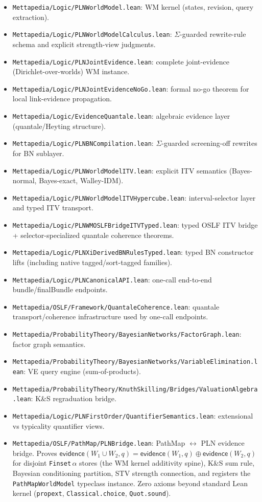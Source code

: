 \documentclass[11pt]{article}
\newcommand{\ev}{\mathsf{evidence}}
\begin{document}
\begin{itemize}[leftmargin=2em]
\item \texttt{Mettapedia/Logic/PLNWorldModel.lean}: WM kernel (states, revision, query extraction).
\item \texttt{Mettapedia/Logic/PLNWorldModelCalculus.lean}: $\Sigma$-guarded rewrite-rule schema
and explicit strength-view judgments.
\item \texttt{Mettapedia/Logic/PLNJointEvidence.lean}: complete joint-evidence (Dirichlet-over-worlds) WM instance.
\item \texttt{Mettapedia/Logic/PLNJointEvidenceNoGo.lean}: formal no-go theorem for local link-evidence propagation.
\item \texttt{Mettapedia/Logic/EvidenceQuantale.lean}: algebraic evidence layer (quantale/Heyting structure).
\item \texttt{Mettapedia/Logic/PLNBNCompilation.lean}: $\Sigma$-guarded screening-off rewrites for BN sublayer.
\item \texttt{Mettapedia/Logic/PLNWorldModelITV.lean}: explicit ITV semantics (Bayes-normal, Bayes-exact, Walley-IDM).
\item \texttt{Mettapedia/Logic/PLNWorldModelITVHypercube.lean}: interval-selector layer and typed ITV transport.
\item \texttt{Mettapedia/Logic/PLNWMOSLFBridgeITVTyped.lean}: typed OSLF ITV bridge + selector-specialized quantale coherence theorems.
\item \texttt{Mettapedia/Logic/PLNXiDerivedBNRulesTyped.lean}: typed BN constructor lifts (including native tagged/sort-tagged families).
\item \texttt{Mettapedia/Logic/PLNCanonicalAPI.lean}: one-call end-to-end bundle/finalBundle endpoints.
\item \texttt{Mettapedia/OSLF/Framework/QuantaleCoherence.lean}: quantale transport/coherence infrastructure used by one-call endpoints.
\item \texttt{Mettapedia/ProbabilityTheory/BayesianNetworks/FactorGraph.lean}: factor graph semantics.
\item \texttt{Mettapedia/ProbabilityTheory/BayesianNetworks/VariableElimination.lean}: VE query engine (sum-of-products).
\item \texttt{Mettapedia/ProbabilityTheory/KnuthSkilling/Bridges/ValuationAlgebra.lean}: K\&S regraduation bridge.
\item \texttt{Mettapedia/Logic/PLNFirstOrder/QuantifierSemantics.lean}: extensional vs typicality quantifier views.
\item \texttt{Mettapedia/OSLF/PathMap/PLNBridge.lean}: PathMap $\leftrightarrow$ PLN evidence bridge.
  Proves $\ev(W_1\cup W_2,q)=\ev(W_1,q)\oplus\ev(W_2,q)$ for disjoint \texttt{Finset}\,$\alpha$ stores
  (the WM kernel additivity spine), K\&S sum rule, Bayesian conditioning partition,
  STV strength connection, and registers the \texttt{PathMapWorldModel} typeclass instance.
  Zero axioms beyond standard Lean kernel (\texttt{propext}, \texttt{Classical.choice}, \texttt{Quot.sound}).
\end{itemize}
\end{document}
